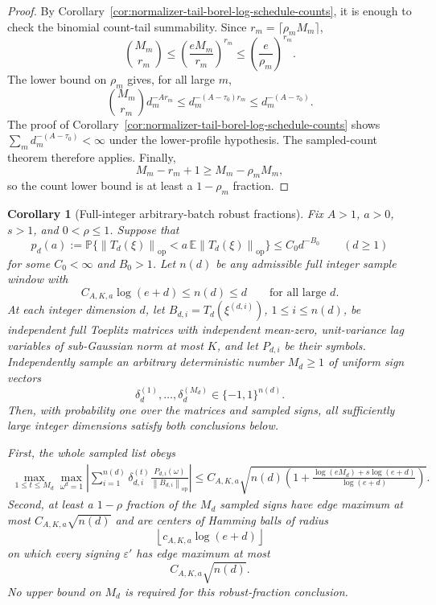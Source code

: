 \documentclass[11pt]{amsart}
\numberwithin{equation}{section}
\newtheorem{corollary}[theorem]{Corollary}
\theoremstyle{definition}
\theoremstyle{remark}
\newcommand{\op}{\mathrm{op}}
\newcommand{\Prob}{\mathbb P}
\newcommand{\Exp}{\mathbb E}
\newcommand{\norm}[1]{\left\lVert #1\right\rVert}
\newcommand{\eps}{\varepsilon}
\begin{document}
\begin{proof}
By Corollary~\ref{cor:normalizer-tail-borel-log-schedule-counts}, it is enough
to check the binomial count-tail summability.  Since \(r_m=\lceil\rho_mM_m\rceil\),
\[
  \binom{M_m}{r_m}
  \le \left(\frac{eM_m}{r_m}\right)^{r_m}
  \le \left(\frac e{\rho_m}\right)^{r_m}.
\]
The lower bound on \(\rho_m\) gives, for all large \(m\),
\[
  \binom{M_m}{r_m}d_m^{-A r_m}
  \le d_m^{-(A-\tau_0) r_m}\le d_m^{-(A-\tau_0)}.
\]
The proof of Corollary~\ref{cor:normalizer-tail-borel-log-schedule-counts} shows
\(\sum_m d_m^{-(A-\tau_0)}<\infty\) under the lower-profile hypothesis.  The
sampled-count theorem therefore applies.  Finally,
\[
  M_m-r_m+1\ge M_m-\rho_mM_m,
\]
so the count lower bound is at least a \(1-\rho_m\) fraction.
\end{proof}

\begin{corollary}[Full-integer arbitrary-batch robust fractions]
\label{cor:normalizer-tail-borel-all-dim-growing-fractions}
Fix \(A>1\), \(a>0\), \(s>1\), and \(0<\rho\le1\).  Suppose that
\[
  p_d(a):=\Prob\{\norm{T_d(\xi)}_{\op}<a\,\Exp\norm{T_d(\xi)}_{\op}\}
  \le C_0d^{-B_0}\qquad(d\ge1)
\]
for some \(C_0<\infty\) and \(B_0>1\).  Let \(n(d)\) be any admissible full
integer sample window with
\[
  C_{A,K,a}\log(e+d)\le n(d)\le d
  \qquad\text{for all large }d .
\]
At each integer dimension \(d\), let \(B_{d,i}=T_d(\xi^{(d,i)})\),
\(1\le i\le n(d)\), be independent full Toeplitz matrices with independent
mean-zero, unit-variance lag variables of sub-Gaussian norm at most \(K\), and
let \(P_{d,i}\) be their symbols.  Independently sample an arbitrary deterministic
number \(M_d\ge1\) of uniform sign vectors
\[
  \delta_d^{(1)},\ldots,\delta_d^{(M_d)}\in\{-1,1\}^{n(d)} .
\]
Then, with probability one over the matrices and sampled signs, all sufficiently
large integer dimensions satisfy both conclusions below.

First, the whole sampled list obeys
\[
\begin{aligned}
  \max_{1\le t\le M_d}\max_{\omega^d=1}
  \left|\sum_{i=1}^{n(d)}\delta_{d,i}^{(t)}
  \frac{P_{d,i}(\omega)}{\norm{B_{d,i}}_{\op}}\right|
  \le
  C_{A,K,a}\sqrt{
    n(d)\left(1+\frac{\log(eM_d)+s\log(e+d)}{\log(e+d)}\right)} .
\end{aligned}
\]
Second, at least a \(1-\rho\) fraction of the \(M_d\) sampled signs have edge
maximum at most \(C_{A,K,a}\sqrt{n(d)}\) and are centers of Hamming balls of
radius
\[
  \left\lfloor c_{A,K,a}\log(e+d)\right\rfloor
\]
on which every signing \(\eps'\) has edge maximum at most
\[
  C_{A,K,a}\sqrt{n(d)} .
\]
No upper bound on \(M_d\) is required for this robust-fraction conclusion.
\end{corollary}
\end{document}
